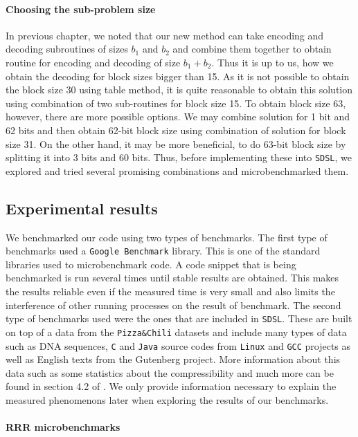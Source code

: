 \paragraph{Choosing the sub-problem size}

In previous chapter, we noted that our new method can take encoding and decoding subroutines
of sizes $b_1$ and $b_2$ and combine them together to obtain routine for encoding and
decoding of size $b_1+b_2$. Thus it is up to us, how we obtain the decoding for block sizes
bigger than 15. As it is not possible to obtain the block size 30 using table method,
it is quite reasonable to obtain this solution using combination of two sub-routines for block
size 15. To obtain block size 63, however, there are more possible options. We may combine
solution for 1 bit and 62 bits and then obtain 62-bit block size using combination of
solution for block size 31. On the other hand, it may be more beneficial, to do 63-bit
block size by splitting it into 3 bits and 60 bits. Thus, before implementing these into
\texttt{SDSL}, we explored and tried several promising combinations and microbenchmarked them.

\subsection{Experimental results}

We benchmarked our code using two types of benchmarks. The first type of benchmarks used
a \texttt{Google Benchmark} library. This is one of the standard libraries used to
microbenchmark code. A code snippet that is being benchmarked is run several times until
stable results are obtained. This makes the results reliable even if the measured time is
very small and also limits the interference of other running processes on the result of
benchmark. The second type of benchmarks used were the ones that are included in \texttt{SDSL}.
These are built on top of a data from the \texttt{Pizza\&Chili} datasets \citep{ferragina2005pizza}
and include many types of data such as DNA sequences, \texttt{C} and \texttt{Java} source codes from
\texttt{Linux} and \texttt{GCC} projects as well as English texts from the Gutenberg project.
More information about this data such as some statistics about the compressibility and much
more can be found in section 4.2 of \cite{ferragina2009compressed}. We only provide information
necessary to explain the measured phenomenons later when exploring the results of our benchmarks.

\paragraph{RRR microbenchmarks}

